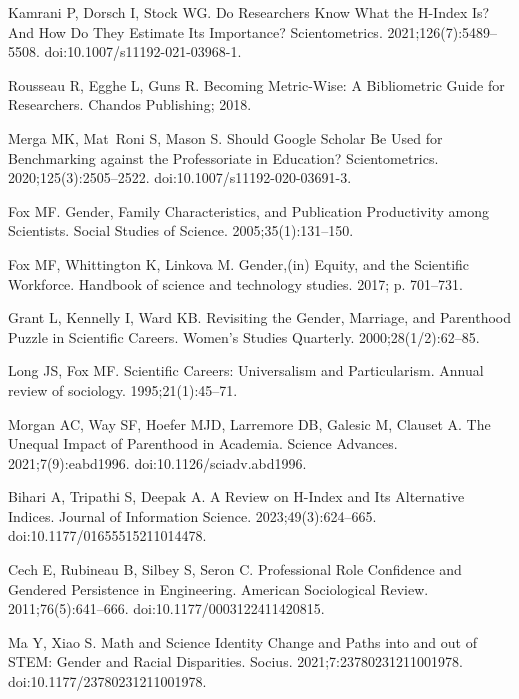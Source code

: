 \documentclass[
  10pt,
  letterpaper,
]{article}
\begin{document}
\begin{thebibliography}{10}
Kamrani P, Dorsch I, Stock WG.
\newblock Do Researchers Know What the H-Index Is? {{And}} How Do They Estimate Its Importance?
\newblock Scientometrics. 2021;126(7):5489--5508.
\newblock doi:{10.1007/s11192-021-03968-1}.

Rousseau R, Egghe L, Guns R.
\newblock Becoming {{Metric-Wise}}: {{A Bibliometric Guide}} for {{Researchers}}.
\newblock Chandos Publishing; 2018.

Merga MK, Mat~Roni S, Mason S.
\newblock Should {{Google Scholar}} Be Used for Benchmarking against the Professoriate in Education?
\newblock Scientometrics. 2020;125(3):2505--2522.
\newblock doi:{10.1007/s11192-020-03691-3}.

Fox MF.
\newblock Gender, Family Characteristics, and Publication Productivity among Scientists.
\newblock Social Studies of Science. 2005;35(1):131--150.

Fox MF, Whittington K, Linkova M.
\newblock Gender,(in) Equity, and the Scientific Workforce.
\newblock Handbook of science and technology studies. 2017; p. 701--731.

Grant L, Kennelly I, Ward KB.
\newblock Revisiting the Gender, Marriage, and Parenthood Puzzle in Scientific Careers.
\newblock Women's Studies Quarterly. 2000;28(1/2):62--85.

Long JS, Fox MF.
\newblock Scientific Careers: {{Universalism}} and Particularism.
\newblock Annual review of sociology. 1995;21(1):45--71.

Morgan AC, Way SF, Hoefer MJD, Larremore DB, Galesic M, Clauset A.
\newblock The Unequal Impact of Parenthood in Academia.
\newblock Science Advances. 2021;7(9):eabd1996.
\newblock doi:{10.1126/sciadv.abd1996}.

Bihari A, Tripathi S, Deepak A.
\newblock A Review on H-Index and Its Alternative Indices.
\newblock Journal of Information Science. 2023;49(3):624--665.
\newblock doi:{10.1177/01655515211014478}.

Cech E, Rubineau B, Silbey S, Seron C.
\newblock Professional {{Role Confidence}} and {{Gendered Persistence}} in {{Engineering}}.
\newblock American Sociological Review. 2011;76(5):641--666.
\newblock doi:{10.1177/0003122411420815}.

Ma Y, Xiao S.
\newblock Math and {{Science Identity Change}} and {{Paths}} into and out of {{STEM}}: {{Gender}} and {{Racial Disparities}}.
\newblock Socius. 2021;7:23780231211001978.
\newblock doi:{10.1177/23780231211001978}.


\end{thebibliography}
\end{document}
